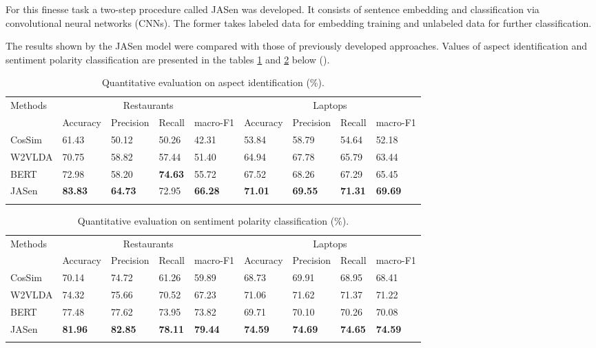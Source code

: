 \documentclass[3p,times,procedia]{elsarticle}
\begin{document}
For this finesse task a two-step procedure called JASen was developed. It consists of sentence embedding and classification via convolutional neural networks (CNNs). The former takes labeled data for embedding training and unlabeled data for further classification.

The results shown by the JASen model were compared with those of previously developed approaches. Values of aspect identification and sentiment polarity classification are presented in the tables \ref{tab:t1} and \ref{tab:t2} below (\cite{huang2020weakly}).

\begin{table}[h]
\caption{Quantitative evaluation on aspect identification (\%).}
\label{tab:t1}
\begin{tabular*}{\hsize}{@{\extracolsep{\fill}}lllllllll@{}}
\toprule
\multirow{2}{*}{Methods} & \multicolumn{4}{c}{Restaurants}          & \multicolumn{4}{c}{Laptops}              \\ 
                         & Accuracy & Precision & Recall & macro-F1 & Accuracy & Precision & Recall & macro-F1 \\
\colrule
CosSim & 61.43 & 50.12 & 50.26 & 42.31 & 53.84 & 58.79 & 54.64 & 52.18 \\
W2VLDA & 70.75 & 58.82 & 57.44 & 51.40 & 64.94 & 67.78 & 65.79 & 63.44 \\
BERT & 72.98 & 58.20 & \textbf{74.63} & 55.72 & 67.52 & 68.26 & 67.29 & 65.45 \\
JASen & \textbf{83.83} & \textbf{64.73} & 72.95 & \textbf{66.28} & \textbf{71.01} & \textbf{69.55} & \textbf{71.31} & \textbf{69.69} \\
\botrule
\end{tabular*}
\end{table}

\begin{table}[h]
\caption{Quantitative evaluation on sentiment polarity classification (\%).}
\label{tab:t2}
\begin{tabular*}{\hsize}{@{\extracolsep{\fill}}lllllllll@{}}
\toprule
\multirow{2}{*}{Methods} & \multicolumn{4}{c}{Restaurants}          & \multicolumn{4}{c}{Laptops}              \\ 
                         & Accuracy & Precision & Recall & macro-F1 & Accuracy & Precision & Recall & macro-F1 \\
\colrule
CosSim & 70.14 & 74.72 & 61.26 & 59.89 & 68.73 & 69.91 & 68.95 & 68.41 \\
W2VLDA & 74.32 & 75.66 & 70.52 & 67.23 & 71.06 & 71.62 & 71.37 & 71.22 \\
BERT & 77.48 & 77.62 & 73.95 & 73.82 & 69.71 & 70.10 & 70.26 & 70.08 \\
JASen & \textbf{81.96} & \textbf{82.85} & \textbf{78.11} & \textbf{79.44} & \textbf{74.59} & \textbf{74.69} & \textbf{74.65} & \textbf{74.59} \\
\botrule
\end{tabular*}
\end{table}
\end{document}
